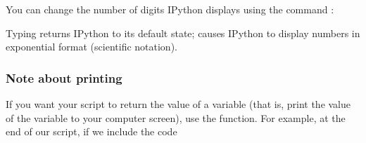 \documentclass[letterpaper,10pt,english]{sphinxmanual}
\begin{document}
\begin{sphinxVerbatim}[commandchars=\\\{\},numbers=left,firstnumber=1,stepnumber=1]


\end{sphinxVerbatim}

\sphinxAtStartPar
You can change the number of digits IPython displays using the command :

\begin{sphinxVerbatim}[commandchars=\\\{\},numbers=left,firstnumber=1,stepnumber=1]
 



\end{sphinxVerbatim}

\sphinxAtStartPar
Typing  returns IPython to its default state;   causes IPython to display numbers in exponential format (scientific notation).


\subsubsection{Note about printing}
\label{\detokenize{chap2/chap2_basics:note-about-printing}}\label{\detokenize{chap2/chap2_basics:printnote}}
\sphinxAtStartPar
If you want your script to return the value of a variable (that is, print the value of the variable to your computer screen), use the  function.  For example, at the end of our script, if we include the code

\begin{sphinxVerbatim}[commandchars=\\\{\}]
\end{sphinxVerbatim}
\end{document}
